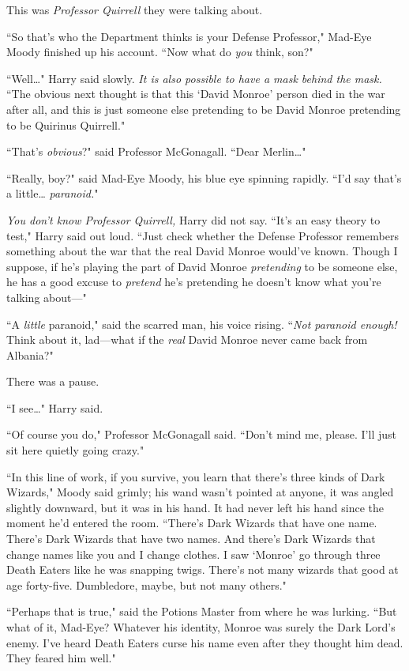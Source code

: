 This was \emph{Professor Quirrell} they were talking about.

``So that's who the Department thinks is your Defense Professor," Mad-Eye Moody finished up his account. ``Now what do \emph{you} think, son?"

``Well{\ldots}" Harry said slowly. \emph{It is also possible to have a mask behind the mask.} ``The obvious next thought is that this `David Monroe' person died in the war after all, and this is just someone else pretending to be David Monroe pretending to be Quirinus Quirrell."

``That's \emph{obvious}?" said Professor McGonagall. ``Dear Merlin{\ldots}"

``Really, boy?" said Mad-Eye Moody, his blue eye spinning rapidly. ``I'd say that's a little{\ldots} \emph{paranoid.}"

\emph{You don't know Professor Quirrell,} Harry did not say. ``It's an easy theory to test," Harry said out loud. ``Just check whether the Defense Professor remembers something about the war that the real David Monroe would've known. Though I suppose, if he's playing the part of David Monroe \emph{pretending} to be someone else, he has a good excuse to \emph{pretend} he's pretending he doesn't know what you're talking about—"

``A \emph{little} paranoid," said the scarred man, his voice rising. ``\emph{Not paranoid enough! } Think about it, lad—what if the \emph{real} David Monroe never came back from Albania?"

There was a pause.

``I see{\ldots}" Harry said.

``Of course you do," Professor McGonagall said. ``Don't mind me, please. I'll just sit here quietly going crazy."

``In this line of work, if you survive, you learn that there's three kinds of Dark Wizards," Moody said grimly; his wand wasn't pointed at anyone, it was angled slightly downward, but it was in his hand. It had never left his hand since the moment he'd entered the room. ``There's Dark Wizards that have one name. There's Dark Wizards that have two names. And there's Dark Wizards that change names like you and I change clothes. I saw `Monroe' go through three Death Eaters like he was snapping twigs. There's not many wizards that good at age forty-five. Dumbledore, maybe, but not many others."

``Perhaps that is true," said the Potions Master from where he was lurking. ``But what of it, Mad-Eye? Whatever his identity, Monroe was surely the Dark Lord's enemy. I've heard Death Eaters curse his name even after they thought him dead. They feared him well."


